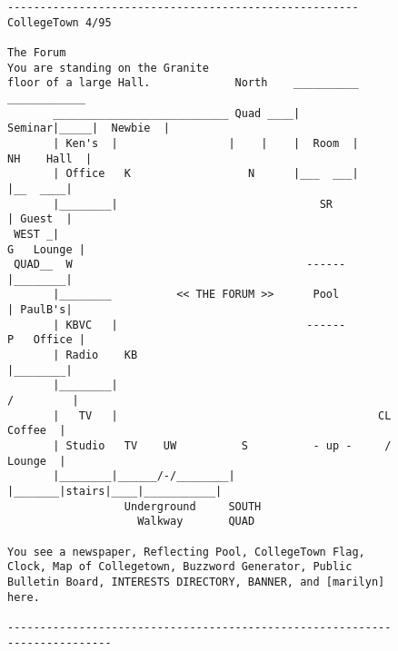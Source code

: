\batchmode
{}
\makeatletter

\setlength{\textwidth}{17cm}

\makeindex

   

\setlength{\textwidth}{5.5in}
\addtolength{\oddsidemargin}{-1in}
\addtolength{\evensidemargin}{-1in}



\newcommand {\tecfamoo}{ {\bf TECFA}{\tt{MOO}} }

\newcommand {\fn}{\tt}

\newcommand {\indexentry}[2]
   {\item #1 #2}

\makeatother
\newenvironment{tex2html_wrap}{}{}
\newwrite\lthtmlwrite
\def\lthtmltypeout#1{{\let\protect\string\immediate\write\lthtmlwrite{#1}}}%
\newbox\sizebox

\pagestyle{empty}
{\newpage
\clearpage
\samepage \begin{figure}[htbp]
  \begin{center}
    \leavevmode
\begin{verbatim}------------------------------------------------------ CollegeTown 4/95

The Forum
You are standing on the Granite
floor of a large Hall.             North    __________     ____________
       ___________________________ Quad ____| Seminar|_____|  Newbie  |
       | Ken's  |                 |    |    |  Room  |    NH    Hall  |
       | Office   K                  N      |___  ___|       |__  ____|
       |________|                               SR           | Guest  |
 WEST _|                                                   G   Lounge |
 QUAD__  W                                    ------         |________|
       |________          << THE FORUM >>      Pool          | PaulB's|
       | KBVC   |                             ------       P   Office |
       | Radio    KB                                         |________|
       |________|                                           /         |
       |   TV   |                                        CL   Coffee  |
       | Studio   TV    UW          S          - up -     /   Lounge  |
       |________|______/-/________|   |_______|stairs|____|___________|
                  Underground     SOUTH
                    Walkway       QUAD

You see a newspaper, Reflecting Pool, CollegeTown Flag, Clock, Map of Collegetown, Buzzword Generator, Public Bulletin Board, INTERESTS DIRECTORY, BANNER, and [marilyn] here.

---------------------------------------------------------------------------\end{verbatim}

    
    \label{fig:WelcomeAreaCollege}
  \end{center}
\end{figure}
}

